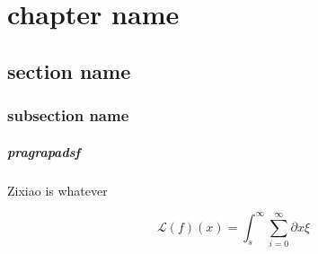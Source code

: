 \documentclass[12pt]{report}
\begin{document}
\chapter{chapter name}
\section{section name}
\subsection{subsection name}
\paragraph{pragrapadsf} Zixiao is whatever

$$ \mathcal{L}(f)(x) = \int_s^\infty \sum_{i=0}^\infty \partial x \xi$$
\end{document}
